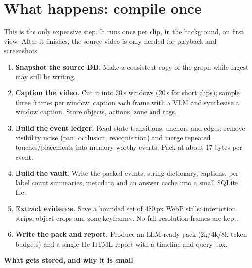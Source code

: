 \documentclass[10pt,a4paper]{article}
\makeatletter
\newcommand{\needspace}[1]{%
  \par\penalty-100
  \begingroup
  \dimen@=#1\relax
  \ifdim\pagegoal<\maxdimen
    \advance\dimen@\pagetotal
    \ifdim\dimen@>\pagegoal
      \vfil\break
    \fi
  \fi
  \endgroup}
\makeatother
\begin{document}
\section{What happens: compile once}

This is the only expensive step. It runs once per clip, in the background, on first view. After it
finishes, the source video is only needed for playback and screenshots.

\begin{enumerate}[leftmargin=1.3em,itemsep=2pt]
  \item \textbf{Snapshot the source DB.} Make a consistent copy of the graph while ingest may still
        be writing.
  \item \textbf{Caption the video.} Cut it into 30\,s windows (20\,s for short clips); sample three
        frames per window; caption each frame with a VLM and synthesise a window caption. Store
        objects, actions, zone and tags.
  \item \textbf{Build the event ledger.} Read state transitions, anchors and edges; remove
        visibility noise (pan, occlusion, reacquisition) and merge repeated touches/placements into
        memory-worthy events. Pack at about 17 bytes per event.
  \item \textbf{Build the vault.} Write the packed events, string dictionary, captions, per-label
        count summaries, metadata and an answer cache into a small SQLite file.
  \item \textbf{Extract evidence.} Save a bounded set of 480\,px WebP stills: interaction strips,
        object crops and zone keyframes. No full-resolution frames are kept.
  \item \textbf{Write the pack and report.} Produce an LLM-ready pack (2k/4k/8k token budgets) and a
        single-file HTML report with a timeline and query box.
\end{enumerate}

\needspace{10\baselineskip}

\noindent
\textbf{What gets stored, and why it is small.}
\end{document}
